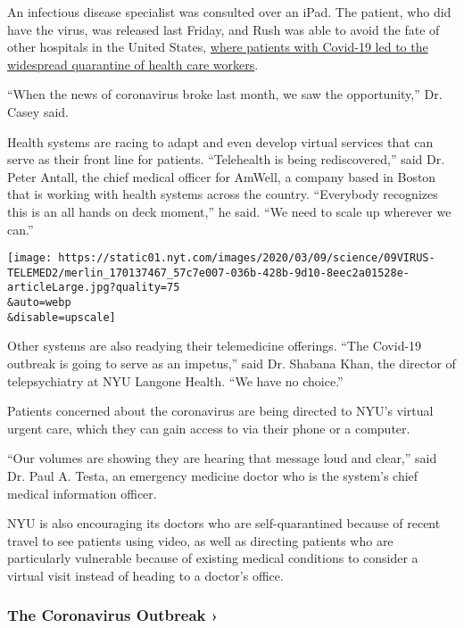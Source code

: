 An infectious disease specialist was consulted over an iPad. The
patient, who did have the virus, was released last Friday, and Rush was
able to avoid the fate of other hospitals in the United States,
\href{https://www.nytimes.com/2020/03/05/us/coronavirus-nurses.html}{where
patients with Covid-19 led to the widespread quarantine of health care
workers}.

``When the news of coronavirus broke last month, we saw the
opportunity,'' Dr. Casey said.

Health systems are racing to adapt and even develop virtual services
that can serve as their front line for patients. ``Telehealth is being
rediscovered,'' said Dr. Peter Antall, the chief medical officer for
AmWell, a company based in Boston that is working with health systems
across the country. ``Everybody recognizes this is an all hands on deck
moment,'' he said. ``We need to scale up wherever we can.''

\texttt{[image: https://static01.nyt.com/images/2020/03/09/science/09VIRUS-TELEMED2/merlin\_170137467\_57c7e007-036b-428b-9d10-8eec2a01528e-articleLarge.jpg?quality=75\\\&auto=webp\\\&disable=upscale]}

Other systems are also readying their telemedicine offerings. ``The
Covid-19 outbreak is going to serve as an impetus,'' said Dr. Shabana
Khan, the director of telepsychiatry at NYU Langone Health. ``We have no
choice.''

Patients concerned about the coronavirus are being directed to NYU's
virtual urgent care, which they can gain access to via their phone or a
computer.

``Our volumes are showing they are hearing that message loud and
clear,'' said Dr. Paul A. Testa, an emergency medicine doctor who is the
system's chief medical information officer.

NYU is also encouraging its doctors who are self-quarantined because of
recent travel to see patients using video, as well as directing patients
who are particularly vulnerable because of existing medical conditions
to consider a virtual visit instead of heading to a doctor's office.

\href{https://www.nytimes.com/news-event/coronavirus?action=click\&pgtype=Article\&state=default\&region=MAIN_CONTENT_3\&context=storylines_faq}{}

\hypertarget{the-coronavirus-outbreak-}{%
\subsubsection{The Coronavirus Outbreak
›}\label{the-coronavirus-outbreak-}}

